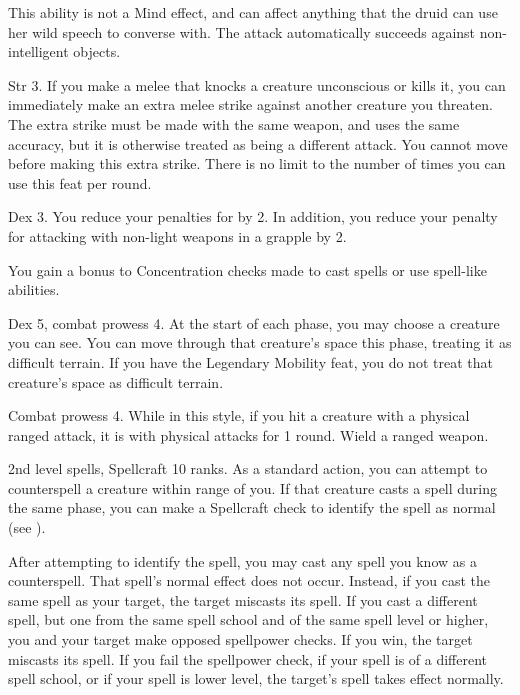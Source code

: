 This ability is not a Mind effect, and can affect anything that the druid can use her wild speech to converse with.
The attack automatically succeeds against non-intelligent objects.

\featpre Str 3.
\featben If you make a melee  that knocks a creature unconscious or kills it, you can immediately make an extra melee strike against another creature you threaten.
The extra strike must be made with the same weapon, and uses the same accuracy, but it is otherwise treated as being a different attack.
You cannot move before making this extra strike.
There is no limit to the number of times you can use this feat per round.

\featpre Dex 3.
\featben You reduce your penalties for  by 2. In addition, you reduce your penalty for attacking with non-light weapons in a grapple by 2.

\featben You gain a  bonus to Concentration checks made to cast spells or use spell-like abilities.

\featpres Dex 5, combat prowess 4.
\featben At the start of each phase, you may choose a creature you can see.
You can move through that creature's space this phase, treating it as difficult terrain.
 If you have the Legendary Mobility feat, you do not treat that creature's space as difficult terrain.

\featpres Combat prowess 4.
\featben While in this style, if you hit a creature with a physical ranged attack, it is \impaired with physical attacks for 1 round.
\stylereq Wield a ranged weapon.

\featpres 2nd level spells, Spellcraft 10 ranks.
\featben As a standard action, you can attempt to counterspell a creature within \rngmed range of you.
If that creature casts a spell during the same phase, you can make a Spellcraft check to identify the spell as normal (see ).

After attempting to identify the spell, you may cast any spell you know as a counterspell.
That spell's normal effect does not occur.
Instead, if you cast the same spell as your target, the target miscasts its spell.
If you cast a different spell, but one from the same spell school and of the same spell level or higher, you and your target make opposed spellpower checks.
If you win, the target miscasts its spell.
If you fail the spellpower check, if your spell is of a different spell school, or if your spell is lower level, the target's spell takes effect normally.

